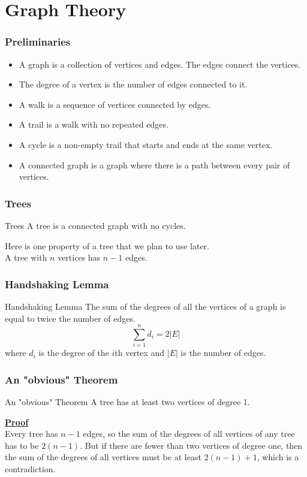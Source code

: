 \documentclass[9pt]{beamer}
\begin{document}
\section{Graph Theory}
\begin{frame}
  \frametitle{Preliminaries}
  \begin{itemize}
   \item A graph is a collection of vertices and edges. The edges connect the vertices.
   \item The degree of a vertex is the number of edges connected to it.
   \item A walk is a sequence of vertices connected by edges.
   \item A trail is a walk with no repeated edges.
   \item A cycle is a non-empty trail that starts and ends at the same vertex.
   \item A connected graph is a graph where there is a path between every pair of vertices.
  \end{itemize}

\end{frame}
\begin{frame}
  \frametitle{Trees}
  \begin{block}{Trees}
    A tree is a connected graph with no cycles.
  \end{block}
  Here is one property of a tree that we plan to use later.
  \\ 
   A tree with $n$ vertices has $n-1$ edges.
\end{frame}
\begin{frame}
  \frametitle{Handshaking Lemma}
  \begin{block}{Handshaking Lemma}
    The sum of the degrees of all the vertices of a graph is equal to twice the number of edges. \\
    $$\sum_{i=1}^{n} d_i = 2|E|$$
    where $d_i$ is the degree of the $i$th vertex and $|E|$ is the number of edges.
    \end{block}    

\end{frame}
\begin{frame}
  \frametitle{An "obvious" Theorem}
  \begin{block}{An "obvious" Theorem}
    A tree has at least two vertices of degree 1.

  \end{block}
  \underline{\textbf{Proof}}\\
  Every tree has $n-1$ edges, so  the sum of the degrees of all vertices of any tree 
  has to be $2(n-1)$. But if there are fewer than two vertices of degree one, 
  then the sum of the degrees of all vertices must be at least $2(n-1)+1$, 
  which is a contradiction.

  \hfill \square




\end{frame}
\end{document}
